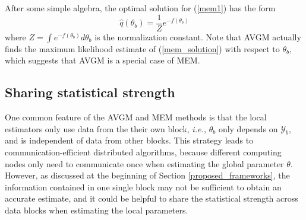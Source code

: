 \documentclass{article}
\newcommand{\ie}[0]{\emph{i.e., }}
\newcommand{\eg}[0]{\emph{e.g., }}
\newcommand{\1}[0]{\ensuremath{\boldsymbol{1}}\xspace}
\begin{document}
After some simple algebra, the optimal solution for (\ref{mem1}) has the form
\begin{equation}\label{mem_solution}
\textstyle \hat q(\theta_b) = \frac{1}{Z}e^{-f(\theta_b)}
\end{equation}
where $Z = \int e^{-f(\theta_b)} d\theta_b$ is the normalization constant. Note that AVGM actually finds the maximum likelihood estimate of (\ref{mem_solution}) with respect to $\theta_b$, which suggests that AVGM is a special case of MEM.


\subsection{Sharing statistical strength}\label{HM}

One common feature of the AVGM and MEM methods is that the local estimators only use data from the their own block, \ie $\theta_b$ only depends on $\mathcal{Y}_b$, and is independent of data from other blocks. This strategy leads to communication-efficient distributed algorithms, because different computing nodes only need to communicate once when estimating the global parameter $\theta$. However, as discussed at the beginning of Section \ref{proposed_frameworks}, the information contained in one single block may not be sufficient to obtain an accurate estimate, and it could be helpful to share the statistical strength across data blocks when estimating the local parameters.
\end{document}
